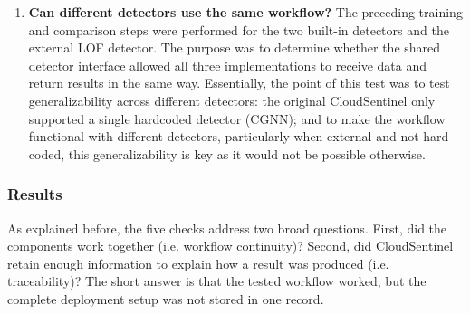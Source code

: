 \begin{enumerate}
    \item[\textbf{Check 5}] \textbf{Can different detectors use the same workflow?}
    The preceding training and comparison steps were performed for the two built-in detectors and the external LOF detector. The purpose was to determine whether the shared detector interface allowed all three implementations to receive data and return results in the same way. Essentially, the point of this test was to test generalizability across different detectors: the original CloudSentinel only supported a single hardcoded detector (CGNN); and to make the workflow functional with different detectors, particularly when external and not hard-coded, this generalizability is key as it would not be possible otherwise.
\end{enumerate}




\subsubsection{Results}

As explained before, the five checks address two broad questions. First, did the components work together (i.e. workflow continuity)? Second, did CloudSentinel retain enough information to explain how a result was produced (i.e. traceability)? The short answer is that the tested workflow worked, but the complete deployment setup was not stored in one record.

